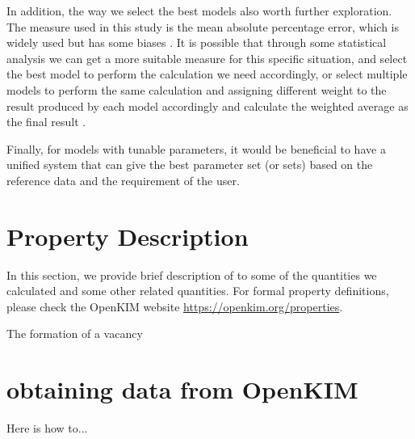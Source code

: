 \documentclass[%
 reprint,
 amsmath,amssymb,
 aps,
]{revtex4-1}
\begin{document}
In addition, the way we select the best models also worth further exploration.
The measure used in this study is the mean absolute percentage error, which is widely used but has some biases \cite{mayer1993statistical}.
It is possible that through some statistical analysis we can get a more suitable measure for this specific situation, and select the best model to perform the calculation we need accordingly, or select multiple models to perform the same calculation and assigning different weight to the result produced by each model accordingly and calculate the weighted average as the final result \cite{frederiksen2004bayesian}.

Finally, for models with tunable parameters, it would be beneficial to have a unified system that can give the best parameter set (or sets) based on the reference data and the requirement of the user.
%

\appendix
\section{Property Description}
\label{app:definition}
In this section, we provide brief description of to some of the quantities we calculated and some other related quantities.
For formal property definitions, please check the OpenKIM website \url{https://openkim.org/properties}.


The formation of a vacancy


\section{obtaining data from OpenKIM}
\label{app:data}
Here is how to...
\end{document}
